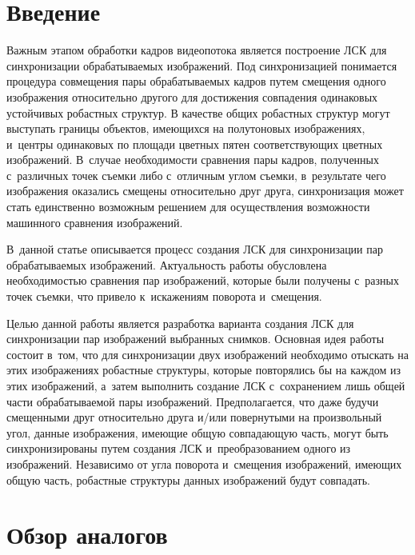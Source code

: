 \begin{multicols}{2}

\label{st\stat}

  \section{Введение}
  
  Важным этапом обработки кадров видеопотока является построение 
ЛСК для синхронизации обрабатываемых 
изображений. Под синхронизацией понимается процедура совмещения пары 
обрабатываемых кадров путем смещения одного изображения относительно 
другого для достижения совпадения одинаковых устойчивых робастных 
структур. В качестве общих робастных структур могут выступать границы 
объектов, имеющихся на полутоновых изображениях, и~центры одинаковых 
по площади цветных пятен соответствующих цветных изображений. 
В~случае необходимости сравнения пары кадров, полученных с~различных 
точек съемки либо с~отличным углом съемки, в~результате чего изображения 
оказались смещены относительно друг друга, синхронизация может стать 
единственно возможным решением для осуществления возможности 
машинного сравнения изображений. 

В~данной статье описывается процесс 
создания ЛСК для синхронизации пар 
обрабатываемых изоб\-ра\-же\-ний. Актуальность работы обусловлена 
необходимостью сравнения пар изоб\-ра\-же\-ний, которые были получены 
с~разных точек съемки, что привело к~искажениям поворота и~смещения. 

Целью данной работы является разработка варианта создания 
ЛСК для синхронизации пар изображений выбранных 
снимков. Основная идея работы состоит в~том, что для синхронизации двух 
изображений необходимо отыскать на этих изображениях робастные 
структуры, которые повторялись бы на каждом из этих изображений, а~затем 
выполнить создание ЛСК с~сохранением лишь 
общей части обрабатываемой пары изображений. Предполагается, что даже 
будучи смещенными друг относительно друга и/или повернутыми на 
произвольный угол, данные изображения, имеющие общую сов\-па\-да\-ющую 
часть, могут быть синхронизированы путем создания ЛСК
 и~преобразованием одного из изображений. Независимо от угла 
поворота и~смещения изображений, имеющих общую часть, робастные 
структуры данных изображений будут сов\-падать. 

\vspace*{-6pt}

  \section{Обзор аналогов}
  

\end{multicols}
